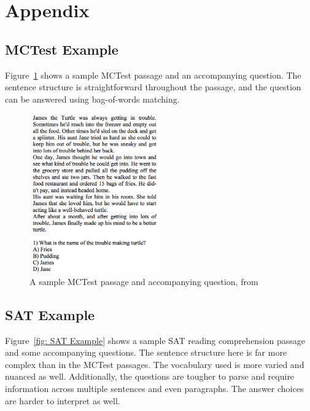 \documentclass[pageno]{final_paper}
\begin{document}
\newpage
{}


\newpage

\section{Appendix}
\label{Appendix}

\subsection{MCTest Example}
\label{MCTest Example}

Figure~\ref{fig: MCTest Example} shows a sample MCTest passage and an
accompanying question. The sentence structure is straightforward throughout the
passage, and the question can be answered using bag-of-words matching.
\vspace{3cm}
\begin{figure}[h]
    \centering
    \includegraphics[width=0.5\textwidth,keepaspectratio]{figures/MCTest_Example.png}
    \caption{A sample MCTest passage and accompanying question, from \cite{Richardson2013}}
    \label{fig: MCTest Example}
\end{figure}

\newpage
\subsection{SAT Example}
\label{SAT Example}

Figure~\ref{fig: SAT Example} shows a sample SAT reading comprehension passage
and some accompanying questions. The sentence structure here is far more complex
than in the MCTest passages. The vocabulary used is more varied and nuanced as
well. Additionally, the questions are tougher to parse and require information
across multiple sentences and even paragraphs. The answer choices are harder to
interpret as well.
\end{document}
